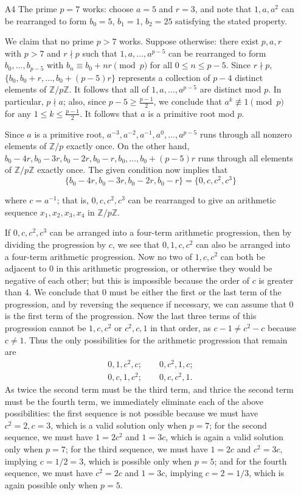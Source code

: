 \documentclass[amssymb,twocolumn,pra,10pt,aps]{revtex4-1}
\begin{document}
\begin{itemize}
\item[A4]
The prime $p=7$ works: choose $a=5$ and $r=3$, and note that $1,a,a^2$ can be rearranged to form $b_0=5$, $b_1=1$, $b_2=25$ satisfying the stated property.

We claim that no prime $p>7$ works. Suppose otherwise: there exist $p,a,r$ with $p>7$ and $r\nmid p$ such that $1,a,\ldots,a^{p-5}$ can be rearranged to form $b_0,\ldots,b_{p-5}$ with $b_n \equiv b_0+nr \pmod{p}$ for all $0\leq n\leq p-5$. Since $r\nmid p$, $\{b_0,b_0+r,\ldots,b_0+(p-5)r\}$ represents a collection of $p-4$ distinct elements of $\mathbb{Z}/p\mathbb{Z}$. It follows that all of $1,a,\ldots,a^{p-5}$ are distinct mod $p$. In particular, $p\nmid a$; also, since $p-5 \geq \frac{p-1}{2}$, we conclude that $a^k \not\equiv 1 \pmod{p}$ for any $1\leq k\leq \frac{p-1}{2}$. It follows that $a$ is a primitive root mod $p$.

Since $a$ is a primitive root, $a^{-3},a^{-2},a^{-1},a^0,\ldots,a^{p-5}$ runs through all nonzero elements of $\mathbb{Z}/p$ exactly once. On the other hand, $b_0-4r,b_0-3r,b_0-2r,b_0-r,b_0,\ldots,b_0+(p-5)r$ runs through all elements of $\mathbb{Z}/p\mathbb{Z}$ exactly once. The given condition now implies that
\[
\{b_0-4r,b_0-3r,b_0-2r,b_0-r\} = \{0,c,c^2,c^3\}
\]

where $c = a^{-1}$; that is, $0,c,c^2,c^3$ can be rearranged to give an arithmetic sequence $x_1,x_2,x_3,x_4$ in $\mathbb{Z}/p\mathbb{Z}$.

If $0, c, c^2, c^3$ can be arranged into a four-term arithmetic progression, then by dividing the progression by $c$,
we see that $0,1,c,c^2$ can also be arranged into a four-term arithmetic progression. Now no two of $1,c,c^2$ can
both be adjacent to 0 in this arithmetic progression, or otherwise they would be negative of each other; but this is
impossible because the order of $c$ is greater than 4. We conclude that 0 must be either the first or the last term of the 
progression, and by reversing the sequence if necessary, we can assume that 0 is the first term of the progression. 
Now the last three terms of this progression cannot be $1,c,c^2$ or $c^2,c,1$ in that order, as $c-1\neq c^2-c$ because $c\neq 1$. 
Thus the only possibilities for the arithmetic progression that remain are
\begin{gather*}
0,1,c^2,c; \qquad
0,c^2,1,c; \\
0,c,1,c^2; \qquad
0,c,c^2,1.
\end{gather*}
As twice the second term must be the third term, and thrice the second term must be the fourth term, we immediately eliminate each of the above possibilities: the first sequence is not possible because we must have $c^2=2, c=3$, which is a valid solution only when $p=7$; for the second sequence, we must have $1=2c^2$ and $1=3c$, which is again a valid solution only when $p=7$; for the third sequence, we must have $1=2c$ and $c^2=3c$, implying $c=1/2=3$, which is possible only when $p=5$; and for the fourth sequence, we must have $c^2=2c$ and $1=3c$, implying $c=2=1/3$, which is again possible only when $p=5$.


\end{itemize}
\end{document}
